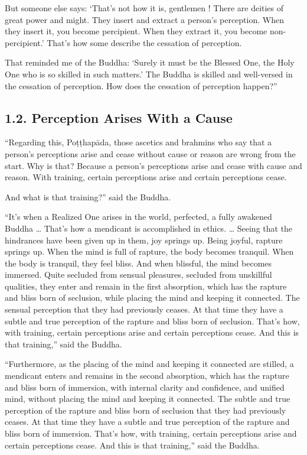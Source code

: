 \documentclass[12pt,openany]{book}%
\begin{document}
But someone else says: ‘That’s not how it is, gentlemen ! There are deities of great power and might. They insert and extract a person’s perception. When they insert it, you become percipient. When they extract it, you become non-percipient.’ That’s how some describe the cessation of perception. 

That reminded me of the Buddha: ‘Surely it must be the Blessed One, the Holy One who is so skilled in such matters.’ The Buddha is skilled and well-versed in the cessation of perception. How does the cessation of perception happen?” 

\subsection*{1.2. Perception Arises With a Cause }

“Regarding this, \textsanskrit{Poṭṭhapāda}, those ascetics and brahmins who say that a person’s perceptions arise and cease without cause or reason are wrong from the start. Why is that? Because a person’s perceptions arise and cease with cause and reason. With training, certain perceptions arise and certain perceptions cease. 

And what is that training?” said the Buddha. 

“It’s when a Realized One arises in the world, perfected, a fully awakened Buddha … That’s how a mendicant is accomplished in ethics. … Seeing that the hindrances have been given up in them, joy springs up. Being joyful, rapture springs up. When the mind is full of rapture, the body becomes tranquil. When the body is tranquil, they feel bliss. And when blissful, the mind becomes immersed. Quite secluded from sensual pleasures, secluded from unskillful qualities, they enter and remain in the first absorption, which has the rapture and bliss born of seclusion, while placing the mind and keeping it connected. The sensual perception that they had previously ceases. At that time they have a subtle and true perception of the rapture and bliss born of seclusion. That’s how, with training, certain perceptions arise and certain perceptions cease. And this is that training,” said the Buddha. 

“Furthermore, as the placing of the mind and keeping it connected are stilled, a mendicant enters and remains in the second absorption, which has the rapture and bliss born of immersion, with internal clarity and confidence, and unified mind, without placing the mind and keeping it connected. The subtle and true perception of the rapture and bliss born of seclusion that they had previously ceases. At that time they have a subtle and true perception of the rapture and bliss born of immersion. That’s how, with training, certain perceptions arise and certain perceptions cease. And this is that training,” said the Buddha. 
\end{document}
